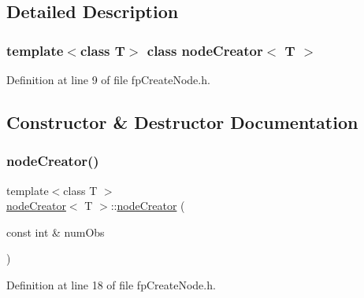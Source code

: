 \subsection{Detailed Description}
\subsubsection*{template$<$class T$>$\newline
class node\+Creator$<$ T $>$}



Definition at line 9 of file fp\+Create\+Node.\+h.



\subsection{Constructor \& Destructor Documentation}
\mbox{\label{classnodeCreator_a460dc030e2aee80345e9c5f1b4fbba7d}} 
\subsubsection{\texorpdfstring{node\+Creator()}{nodeCreator()}}
{\footnotesize\ttfamily template$<$class T $>$ \\
\hyperlink{classnodeCreator}{node\+Creator}$<$ T $>$\+::\hyperlink{classnodeCreator}{node\+Creator} (\begin{DoxyParamCaption}\item[{const int \&}]{num\+Obs }\end{DoxyParamCaption})\hspace{0.3cm}{\ttfamily [inline]}}



Definition at line 18 of file fp\+Create\+Node.\+h.


